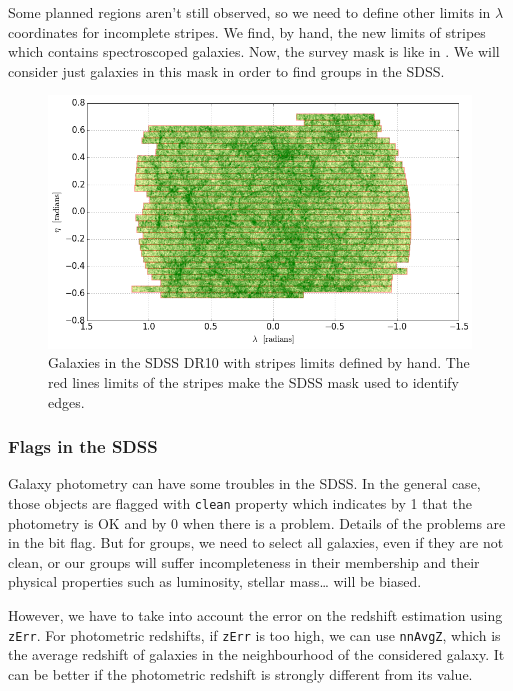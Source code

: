 Some planned regions aren't still observed, so we need to define other limits
in $\lambda$ coordinates for incomplete stripes. We find, by hand, the new
limits of stripes which contains spectroscoped galaxies. Now, the survey mask
is like in . We will consider just galaxies in this mask in
order to find groups in the SDSS\@.
%
\begin{figure}[ht] \centering
    \includegraphics[width=\linewidth]{figures/sdss/sdss.png}
    \caption{Galaxies in the SDSS DR10 with stripes limits defined by hand. The
    red lines limits of the stripes make the SDSS mask used to identify
edges.\label{fig:sdss}}
\end{figure}

\subsubsection{Flags in the SDSS}

Galaxy photometry can have some troubles in the SDSS\@. In the general case,
those objects are flagged with \texttt{clean} property which indicates by 1
that the photometry is OK and by 0 when there is a problem. Details of the
problems are in the bit flag. But for groups, we need to select all galaxies,
even if they are not clean, or our groups will suffer incompleteness in their
membership and their physical properties such as luminosity, stellar mass\ldots
will be biased.

However, we have to take into account the error on the redshift estimation
using \texttt{zErr}. For photometric redshifts, if \texttt{zErr} is too high,
we can use \texttt{nnAvgZ}, which is the average redshift of galaxies in the
neighbourhood of the considered galaxy. It can be better if the photometric
redshift is strongly different from its value.


